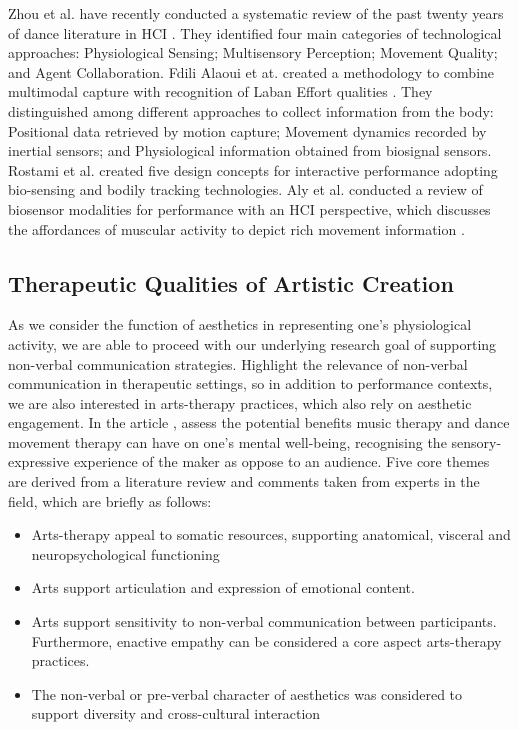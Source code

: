 Zhou et al. have recently conducted a systematic review of the past twenty years of dance literature in HCI \cite{zhou_dance_2021}. They identified four main categories of technological approaches: Physiological Sensing; Multisensory Perception; Movement Quality; and Agent Collaboration. Fdili Alaoui et at. created a methodology to combine multimodal capture with recognition of Laban Effort qualities \cite{fdili_alaoui_seeing_2017}. They distinguished among different approaches to collect information from the body: Positional data retrieved by motion capture; Movement dynamics recorded by inertial sensors; and Physiological information obtained from biosignal sensors. Rostami et al. \cite{rostami_bio-sensed_2017} created five design concepts for interactive performance adopting bio-sensing and bodily tracking technologies. Aly et al. conducted a review of biosensor modalities for performance with an HCI perspective, which discusses the affordances of muscular activity to depict rich movement information \cite{aly_appropriating_2021}.

\subsection{Therapeutic Qualities of Artistic Creation}

As we consider the function of aesthetics in representing one's physiological activity, we are able to proceed with our underlying research goal of supporting non-verbal communication strategies. Highlight the relevance of non-verbal communication in therapeutic settings, so in addition to performance contexts, we are also interested in arts-therapy practices, which also rely on aesthetic engagement. In the article \cite{samaritter_aesthetic_2018}, \citeauthor{samaritter_aesthetic_2018} assess the potential benefits music therapy and dance movement therapy can have on one's mental well-being, recognising the sensory-expressive experience of the maker as oppose to an audience. Five core themes are derived from a literature review and comments taken from experts in the field, which are briefly as follows:

\begin{itemize}
\item Arts-therapy appeal to somatic resources, supporting anatomical, visceral and neuropsychological functioning
\item Arts support articulation and expression of emotional content.
\item Arts support sensitivity to non-verbal communication between participants. Furthermore, enactive empathy can be considered a core aspect arts-therapy practices.
\item The non-verbal or pre-verbal character of aesthetics was considered to support diversity and cross-cultural interaction
\end{itemize}

